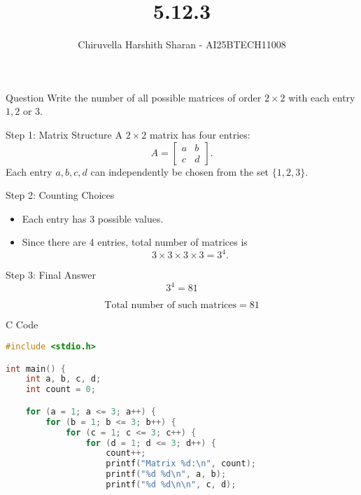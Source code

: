 \documentclass{beamer}
\title{5.12.3}
\author{Chiruvella Harshith Sharan - AI25BTECH11008}
\begin{document}
\frame{\titlepage}


\begin{frame}{Question}
Write the number of all possible matrices of order \(2\times 2\) with each entry \(1,2\) or \(3\).
\end{frame}


\begin{frame}{Step 1: Matrix Structure}
A \(2\times 2\) matrix has four entries:
\[
A = \begin{bmatrix}
a & b \\
c & d
\end{bmatrix}.
\]
Each entry \(a,b,c,d\) can independently be chosen from the set \(\{1,2,3\}\).
\end{frame}


\begin{frame}{Step 2: Counting Choices}
\begin{itemize}
    \item Each entry has 3 possible values.
    \item Since there are 4 entries, total number of matrices is
    \[
    3 \times 3 \times 3 \times 3 = 3^4.
    \]
\end{itemize}
\end{frame}


\begin{frame}{Step 3: Final Answer}
\[
3^4 = 81
\]

\[
\boxed{\text{Total number of such matrices} = 81}
\]
\end{frame}


\begin{frame}[fragile]{C Code}
\begin{lstlisting}[language=C]
#include <stdio.h>

int main() {
    int a, b, c, d;
    int count = 0;

    for (a = 1; a <= 3; a++) {
        for (b = 1; b <= 3; b++) {
            for (c = 1; c <= 3; c++) {
                for (d = 1; d <= 3; d++) {
                    count++;
                    printf("Matrix %d:\n", count);
                    printf("%d %d\n", a, b);
                    printf("%d %d\n\n", c, d);
\end{lstlisting}
\end{frame}
\end{document}
